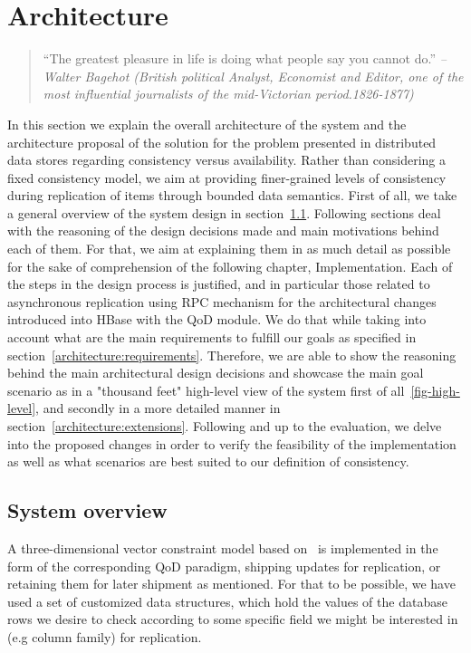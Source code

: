 \chapter{Architecture}
\label{ch:architecture}

\begin{quotation}
“The greatest pleasure in life is doing what people say you cannot do.”
{\small\it -- Walter Bagehot (British political Analyst, Economist and Editor, one of the most influential journalists of the mid-Victorian period.1826-1877) }
\end{quotation}

In this section we explain the overall architecture of the system and the architecture proposal of the solution for the problem presented in distributed data stores regarding consistency versus availability. Rather than considering a fixed consistency model, we aim at providing finer-grained levels of consistency during replication of items through bounded data semantics. First of all, we take a general overview of the system design in section~\ref{architecture:overview}. Following sections deal with the reasoning of the design decisions made and main motivations behind each of them. For that, we aim at explaining them in as much detail as possible for the sake of comprehension of the following chapter, Implementation. Each of the steps in the design process is justified, and in particular those related to asynchronous replication using RPC mechanism for the architectural changes introduced into HBase with the QoD module. We do that while taking into account what are the main requirements to fulfill our goals as specified in section~\ref{architecture:requirements}. Therefore, we are able to show the reasoning behind the main architectural design decisions and showcase the main goal scenario as in a "thousand feet" high-level view of the system first of all~\ref{fig-high-level}, and secondly in a more detailed manner in section~\ref{architecture:extensions}. Following and up to the evaluation, we delve into the proposed changes in order to verify the feasibility of the implementation as well as what scenarios are best suited to our definition of consistency.

\section{System overview}\label{architecture:overview}
A three-dimensional vector constraint model based on~\cite{Santos:2010} is implemented in the form of the corresponding QoD paradigm, shipping updates for replication, or retaining them for later shipment as mentioned. For that to be possible, we have used a set of customized data structures, which hold the values of the database rows we desire to check according to some specific field we might be interested in (e.g column family) for replication. 

